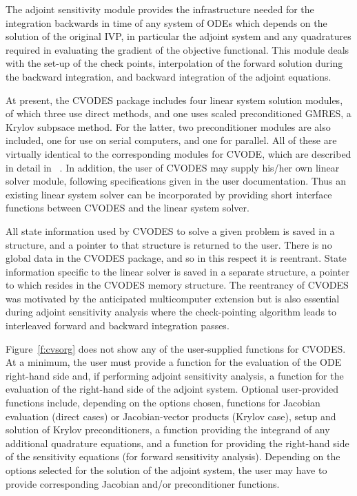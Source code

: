 The adjoint sensitivity module provides the infrastructure needed for
the integration backwards in time of any system of ODEs which depends
on the solution of the original IVP, in particular the adjoint system
and any quadratures required in evaluating the gradient of the
objective functional.  This module deals with the set-up of the check
points, interpolation of the forward solution during the backward
integration, and backward integration of the adjoint equations.

At present, the CVODES package includes four linear system solution
modules, of which three use direct methods, and one uses scaled
preconditioned GMRES, a Krylov subpsace method.  For the latter, two
preconditioner modules are also included, one for use on serial
computers, and one for parallel.  All of these are virtually identical
to the corresponding modules for CVODE, which are described in detail
in ~\cite{HBGLSSW:04}.  In addition, the user of CVODES may supply
his/her own linear solver module, following specifications given in
the user documentation.  Thus an existing linear system solver can be
incorporated by providing short interface functions between CVODES
and the linear system solver.

All state information used by CVODES to solve a given problem is saved
in a structure, and a pointer to that structure is returned to the
user.  There is no global data in the CVODES package, and so in this
respect it is reentrant. State information specific to the linear
solver is saved in a separate structure, a pointer to which resides in
the CVODES memory structure. The reentrancy of CVODES was motivated
by the anticipated multicomputer extension but is also essential
during adjoint sensitivity analysis where the check-pointing algorithm
leads to interleaved forward and backward integration passes. 

Figure~\ref{f:cvsorg} does not show any of the user-supplied functions
for CVODES. At a minimum, the user must provide a function for the
evaluation of the ODE right-hand side and, if performing adjoint
sensitivity analysis, a function for the evaluation of the right-hand
side of the adjoint system.  Optional user-provided functions include,
depending on the options chosen, functions for Jacobian evaluation
(direct cases) or Jacobian-vector products (Krylov case), setup and
solution of Krylov preconditioners, a function providing the integrand
of any additional quadrature equations, and a function for providing
the right-hand side of the sensitivity equations (for forward
sensitivity analysis). Depending on the options selected for the
solution of the adjoint system, the user may have to provide
corresponding Jacobian and/or preconditioner functions.

